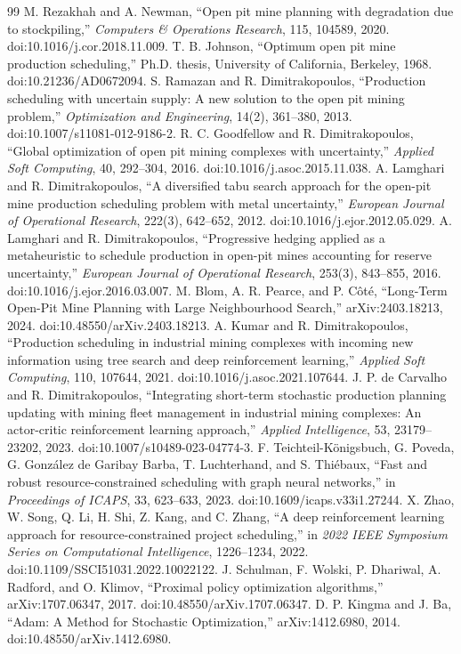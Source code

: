 \documentclass[11pt]{article}
\begin{document}
\begin{thebibliography}{99}
 M. Rezakhah and A. Newman, ``Open pit mine planning with degradation due to stockpiling,'' \emph{Computers \& Operations Research}, 115, 104589, 2020. doi:10.1016/j.cor.2018.11.009.
 T. B. Johnson, ``Optimum open pit mine production scheduling,'' Ph.D. thesis, University of California, Berkeley, 1968. doi:10.21236/AD0672094.
 S. Ramazan and R. Dimitrakopoulos, ``Production scheduling with uncertain supply: A new solution to the open pit mining problem,'' \emph{Optimization and Engineering}, 14(2), 361--380, 2013. doi:10.1007/s11081-012-9186-2.
 R. C. Goodfellow and R. Dimitrakopoulos, ``Global optimization of open pit mining complexes with uncertainty,'' \emph{Applied Soft Computing}, 40, 292--304, 2016. doi:10.1016/j.asoc.2015.11.038.
 A. Lamghari and R. Dimitrakopoulos, ``A diversified tabu search approach for the open-pit mine production scheduling problem with metal uncertainty,'' \emph{European Journal of Operational Research}, 222(3), 642--652, 2012. doi:10.1016/j.ejor.2012.05.029.
 A. Lamghari and R. Dimitrakopoulos, ``Progressive hedging applied as a metaheuristic to schedule production in open-pit mines accounting for reserve uncertainty,'' \emph{European Journal of Operational Research}, 253(3), 843--855, 2016. doi:10.1016/j.ejor.2016.03.007.
 M. Blom, A. R. Pearce, and P. C\^ot\'e, ``Long-Term Open-Pit Mine Planning with Large Neighbourhood Search,'' arXiv:2403.18213, 2024. doi:10.48550/arXiv.2403.18213.
 A. Kumar and R. Dimitrakopoulos, ``Production scheduling in industrial mining complexes with incoming new information using tree search and deep reinforcement learning,'' \emph{Applied Soft Computing}, 110, 107644, 2021. doi:10.1016/j.asoc.2021.107644.
 J. P. de Carvalho and R. Dimitrakopoulos, ``Integrating short-term stochastic production planning updating with mining fleet management in industrial mining complexes: An actor-critic reinforcement learning approach,'' \emph{Applied Intelligence}, 53, 23179--23202, 2023. doi:10.1007/s10489-023-04774-3.
 F. Teichteil-K\"onigsbuch, G. Poveda, G. Gonz\'alez de Garibay Barba, T. Luchterhand, and S. Thi\'ebaux, ``Fast and robust resource-constrained scheduling with graph neural networks,'' in \emph{Proceedings of ICAPS}, 33, 623--633, 2023. doi:10.1609/icaps.v33i1.27244.
 X. Zhao, W. Song, Q. Li, H. Shi, Z. Kang, and C. Zhang, ``A deep reinforcement learning approach for resource-constrained project scheduling,'' in \emph{2022 IEEE Symposium Series on Computational Intelligence}, 1226--1234, 2022. doi:10.1109/SSCI51031.2022.10022122.
 J. Schulman, F. Wolski, P. Dhariwal, A. Radford, and O. Klimov, ``Proximal policy optimization algorithms,'' arXiv:1707.06347, 2017. doi:10.48550/arXiv.1707.06347.
 D. P. Kingma and J. Ba, ``Adam: A Method for Stochastic Optimization,'' arXiv:1412.6980, 2014. doi:10.48550/arXiv.1412.6980.
\end{thebibliography}
\end{document}
